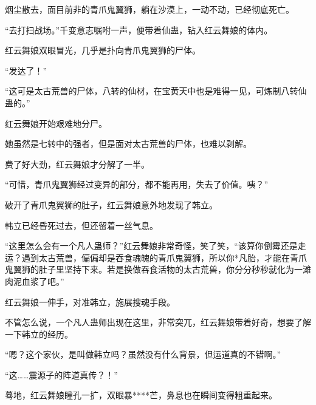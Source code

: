 \begin{this_body}
烟尘散去，面目前非的青爪鬼翼狮，躺在沙漠上，一动不动，已经彻底死亡。

“去打扫战场。”千变意志嘱咐一声，便带着仙蛊，钻入红云舞娘的体内。

红云舞娘双眼冒光，几乎是扑向青爪鬼翼狮的尸体。

“发达了！”

“这可是太古荒兽的尸体，八转的仙材，在宝黄天中也是难得一见，可炼制八转仙蛊的。”

红云舞娘开始艰难地分尸。

她虽然是七转中的强者，但是面对太古荒兽的尸体，也难以剥解。

费了好大劲，红云舞娘才分解了一半。

“可惜，青爪鬼翼狮经过变异的部分，都不能再用，失去了价值。咦？”

破开了青爪鬼翼狮的肚子，红云舞娘意外地发现了韩立。

韩立已经昏死过去，但还留着一丝气息。

“这里怎么会有一个凡人蛊师？”红云舞娘非常奇怪，笑了笑，“该算你倒霉还是走运？遇到太古荒兽，偏偏却是吞食魂魄的青爪鬼翼狮，所以你*凡胎，才能在青爪鬼翼狮的肚子里坚持下来。若是换做吞食活物的太古荒兽，你分分秒秒就化为一滩肉泥血浆了吧。”

红云舞娘一伸手，对准韩立，施展搜魂手段。

不管怎么说，一个凡人蛊师出现在这里，非常突兀，红云舞娘带着好奇，想要了解一下韩立的经历。

“嗯？这个家伙，是叫做韩立吗？虽然没有什么背景，但运道真的不错啊。”

“这……震源子的阵道真传？！”

蓦地，红云舞娘瞳孔一扩，双眼暴****芒，鼻息也在瞬间变得粗重起来。

\end{this_body}

